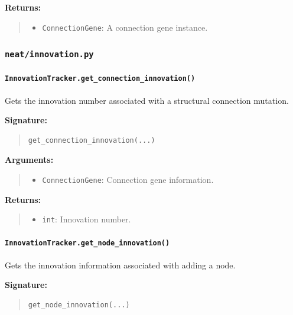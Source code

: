 \documentclass[11pt]{article}
\begin{document}
\textbf{Returns:}
\begin{quote}
\begin{itemize}
    \item \texttt{ConnectionGene}: A connection gene instance.
\end{itemize}
\end{quote}


\subsubsection{\texttt{neat/innovation.py}}

\paragraph{\texttt{InnovationTracker.get\_connection\_innovation()}}

Gets the innovation number associated with a structural connection mutation.

\textbf{Signature:}
\begin{quote}
\begin{verbatim}
get_connection_innovation(...)
\end{verbatim}
\end{quote}

\textbf{Arguments:}
\begin{quote}
\begin{itemize}
    \item \texttt{ConnectionGene}: Connection gene information.
\end{itemize}
\end{quote}

\textbf{Returns:}
\begin{quote}
\begin{itemize}
    \item \texttt{int}: Innovation number.
\end{itemize}
\end{quote}

\paragraph{\texttt{InnovationTracker.get\_node\_innovation()}}

Gets the innovation information associated with adding a node.

\textbf{Signature:}
\begin{quote}
\begin{verbatim}
get_node_innovation(...)
\end{verbatim}
\end{quote}
\end{document}
